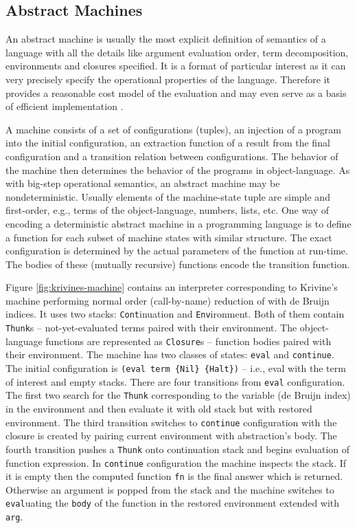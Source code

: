 \subsection*{Abstract Machines}
% 
An abstract machine \cite{landin-secd} is usually the most explicit definition of semantics of a language with all the details like argument evaluation order, term decomposition, environments and closures specified.
It is a format of particular interest as it can very precisely specify the operational properties of the language.
Therefore it provides a reasonable cost model of the evaluation and may even serve as a basis of efficient implementation \cite{leroy-zinc}.

A machine consists of a set of configurations (tuples), an injection of a program into the initial configuration, an extraction function of a result from the final configuration and a transition relation between configurations.
The behavior of the machine then determines the behavior of the programs in object-language.
As with big-step operational semantics, an abstract machine may be nondeterministic.
Usually elements of the machine-state tuple are simple and first-order, e.g., terms of the object-language, numbers, lists, etc.
One way of encoding a deterministic abstract machine in a programming language is to define a function for each subset of machine states with similar structure.
The exact configuration is determined by the actual parameters of the function at run-time.
The bodies of these (mutually recursive) functions encode the transition function.

Figure \ref{fig:krivines-machine} contains an interpreter corresponding to Krivine's machine \cite{krivine-machine} performing normal order (call-by-name) reduction of \LC{} with de Bruijn indices.
It uses two stacks: \lstinline!Cont!inuation and \lstinline!Env!ironment.
Both of them contain \lstinline!Thunk!s -- not-yet-evaluated terms paired with their environment.
The object-language functions are represented as \lstinline!Closure!s -- function bodies paired with their environment.
The machine has two classes of states: \lstinline!eval! and \lstinline!continue!.
The initial configuration is \lstinline!(eval term {Nil} {Halt})! -- i.e., eval with the term of interest and empty stacks.
There are four transitions from \lstinline!eval! configuration.
The first two search for the \lstinline!Thunk! corresponding to the variable (de Bruijn index) in the environment and then evaluate it with old stack but with restored environment.
The third transition switches to \lstinline!continue! configuration with the closure is created by pairing current environment with abstraction's body.
The fourth transition pushes a \lstinline!Thunk! onto continuation stack and begins evaluation of function expression.
In \lstinline!continue! configuration the machine inspects the stack.
If it is empty then the computed function \lstinline!fn! is the final answer which is returned.
Otherwise an argument is popped from the stack and the machine switches to \lstinline!eval!uating the \lstinline!body! of the function in the restored environment extended with \lstinline!arg!.

